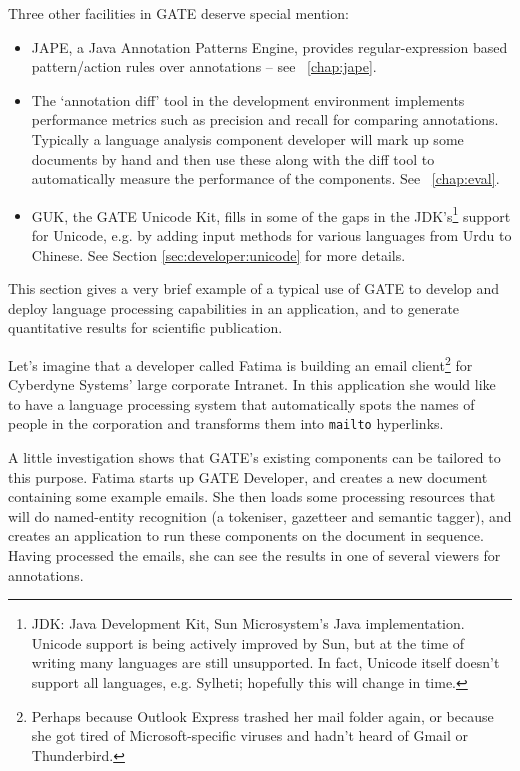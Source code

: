 Three other facilities in GATE deserve special mention:
%
\begin{itemize}
%
\item
JAPE, a Java Annotation Patterns Engine, provides regular-expression based
pattern/action rules over annotations -- see \Chapthing~\ref{chap:jape}.
%
\item
The `annotation diff' tool in the development environment implements
performance metrics such as precision and recall for comparing annotations.
Typically a language analysis component developer will mark up some documents
by hand and then use these along with the diff tool to automatically measure
the performance of the components. See \Chapthing\ \ref{chap:eval}.
%
\item
GUK, the GATE Unicode Kit, fills in some of the gaps in the JDK's\footnote{JDK:
Java Development Kit, Sun Microsystem's Java implementation. Unicode support
is being actively improved by Sun, but at the time of writing many languages
are still unsupported. In fact, Unicode itself doesn't support all languages,
e.g. Sylheti; hopefully this will change in time.} support for
Unicode, e.g. by adding input methods for various languages from Urdu to
Chinese. See Section \ref{sec:developer:unicode} for more details.
\end{itemize}
%


This section gives a very brief example of a typical use of GATE to develop
and deploy language processing capabilities in an application, and to
generate quantitative results for scientific publication.

Let's imagine that a developer called Fatima is building an email
client\footnote{Perhaps because
Outlook Express trashed her mail folder again, or because she got tired of
Microsoft-specific viruses and hadn't heard of Gmail or Thunderbird.} for
Cyberdyne Systems' large corporate Intranet.
In this application she would like to have a language processing system
that automatically spots the names of people in the corporation and
transforms them into {\tt mailto} hyperlinks.

A little investigation shows that GATE's existing components can be
tailored to this purpose. Fatima starts up GATE Developer, and creates
a new document containing some example emails. She then loads some
processing resources that will do named-entity recognition (a
tokeniser, gazetteer and semantic tagger), and creates an application
to run these components on the document in sequence. Having processed
the emails, she can see the results in one of several viewers for
annotations.

